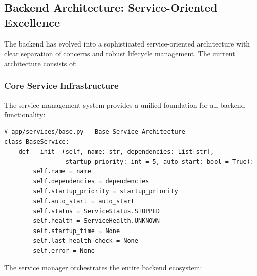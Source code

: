 \documentclass[11pt]{article}
\begin{document}
\subsection{Backend Architecture: Service-Oriented Excellence}

The backend has evolved into a sophisticated service-oriented architecture with clear separation of concerns and robust lifecycle management. The current architecture consists of:

\subsubsection{Core Service Infrastructure}

The service management system provides a unified foundation for all backend functionality:

\begin{lstlisting}[style=python]
# app/services/base.py - Base Service Architecture
class BaseService:
    def __init__(self, name: str, dependencies: List[str], 
                 startup_priority: int = 5, auto_start: bool = True):
        self.name = name
        self.dependencies = dependencies
        self.startup_priority = startup_priority
        self.auto_start = auto_start
        self.status = ServiceStatus.STOPPED
        self.health = ServiceHealth.UNKNOWN
        self.startup_time = None
        self.last_health_check = None
        self.error = None
\end{lstlisting}

The service manager orchestrates the entire backend ecosystem:
\end{document}
